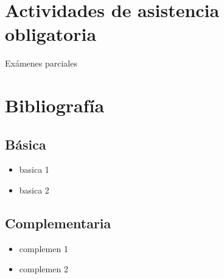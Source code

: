 \documentclass[11pt]{article}
\begin{document}
\section*{Actividades de asistencia obligatoria}

Exámenes parciales

\section*{Bibliografía}

\subsection*{Básica}

\begin{itemize}
\item basica 1  \item  basica 2  
\end{itemize}

\subsection*{Complementaria}

\begin{itemize}
\item complemen 1  \item  complemen 2  
\end{itemize}
\end{document}
